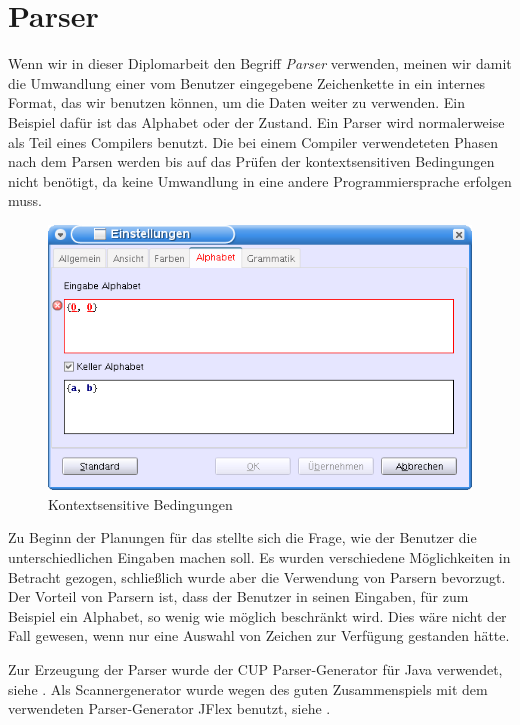 \section{Parser}\label{Parser}

Wenn wir in dieser Diplomarbeit den Begriff {\em Parser} verwenden, meinen wir
damit die Umwandlung einer vom Benutzer eingegebene Zeichenkette in ein internes
Format, das wir benutzen können, um die Daten weiter zu verwenden. Ein Beispiel
dafür ist das Alphabet oder der Zustand. Ein Parser wird normalerweise als Teil
eines Compilers benutzt. Die bei einem Compiler verwendeteten Phasen nach dem
Parsen werden bis auf das Prüfen der kontextsensitiven Bedingungen nicht
benötigt, da keine Umwandlung in eine andere Programmiersprache erfolgen
muss.\vspace{10pt}

\begin{figure}[h!]
\begin{center}
\includegraphics[width=12cm]{../images/parser.png}
\caption{Kontextsensitive Bedingungen}
\label{FigureParser}
\end{center}
\end{figure}
\vspace{10pt}

Zu Beginn der Planungen für das \gtitool stellte sich die Frage, wie der Benutzer
die unterschiedlichen Eingaben machen soll. Es wurden verschiedene
Möglichkeiten in Betracht gezogen, schließlich wurde aber die Verwendung von
Parsern bevorzugt. Der Vorteil von Parsern ist, dass der Benutzer in seinen
Eingaben, für zum Beispiel ein Alphabet, so wenig wie möglich beschränkt wird.
Dies wäre nicht der Fall gewesen, wenn nur eine Auswahl von Zeichen zur
Verfügung gestanden hätte.\vspace{10pt}

Zur Erzeugung der Parser wurde der CUP Parser-Generator für Java verwendet, siehe
\cite{java-cup}. Als Scannergenerator wurde wegen des guten Zusammenspiels mit
dem verwendeten Parser-Generator JFlex benutzt, siehe
\cite{jflex}.\vspace{10pt}


